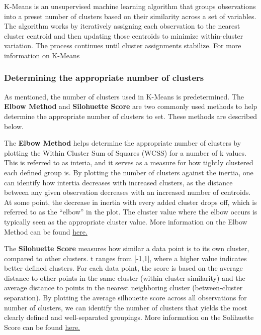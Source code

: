 \documentclass{article}
\begin{document}
K-Means is an unsupervised machine learning algorithm that groups observations into a preset number of clusters based on their similarity across a set of variables. The algorithm works by iteratively assigning each observation to the nearest cluster centroid and then updating those centroids to minimize within-cluster variation. The process continues until cluster assignments stabilize. For more information on K-Means

\subsubsection{Determining the appropriate number of clusters}

As mentioned, the number of clusters used in K-Means is predetermined. The \textbf{Elbow Method} and \textbf{Silohuette Score} are two commonly used methods to help determine the appropriate number of clusters to set. These methods are described below.

The \textbf{Elbow Method} helps determine the appropriate number of clusters by plotting the Within Cluster Sum of Squares (WCSS) for a number of k values. This is referred to as interia, and it serves as a measure for how tightly clustered each defined group is. By plotting the number of clusters against the inertia, one can identify how intertia decreases with increased clusters, as the distance between any given observation decreases with an increased number of centroids. At some point, the decrease in inertia with every added cluster drops off, which is referred to as the ``elbow'' in the plot. The cluster value where the elbow occurs is typically seen as the appropriate cluster value. More information on the Elbow Method can be found \href{https://www.geeksforgeeks.org/machine-learning/elbow-method-for-optimal-value-of-k-in-kmeans/}{here.}

The \textbf{Silohuette Score} measures how similar a data point is to its own cluster, compared to other clusters. t ranges from [-1,1], where a higher value indicates better defined clusters. For each data point, the score is based on the average distance to other points in the same cluster (within-cluster similarity) and the average distance to points in the nearest neighboring cluster (between-cluster separation). By plotting the average silhouette score across all observations for number of clusters, we can identify the number of clusters that yields the most clearly defined and well-separated groupings. More information on the Solihuette Score can be found \href{https://www.geeksforgeeks.org/machine-learning/what-is-silhouette-score/}{here.}
\end{document}
